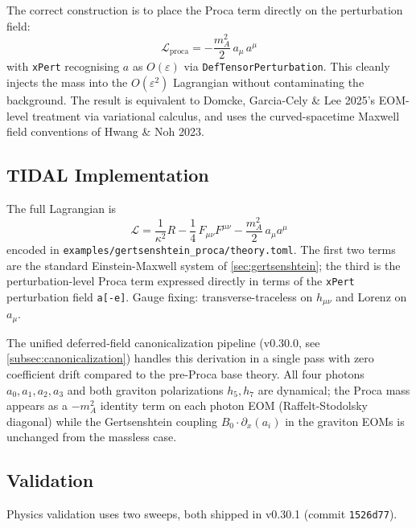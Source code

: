 The correct construction is to place the Proca term directly on the
perturbation field:
\begin{equation}
  \mathcal{L}_{\mathrm{proca}}
  = - \frac{m_A^2}{2}\, a_\mu\, a^\mu
  \label{eq:proca-perturbation}
\end{equation}
with \texttt{xPert} recognising $a$ as $O(\varepsilon)$ via
\texttt{DefTensorPerturbation}. This cleanly injects the mass into the
$O(\varepsilon^2)$ Lagrangian without contaminating the background. The
result is equivalent to Domcke, Garcia-Cely \& Lee 2025's EOM-level
treatment via variational calculus, and uses the curved-spacetime Maxwell
field conventions of Hwang \& Noh 2023.

\subsection{TIDAL Implementation}
\label{subsec:proca-implementation}

The full Lagrangian is
\begin{equation}
  \mathcal{L}
  = \frac{1}{\kappa^2} R
    - \frac{1}{4}\, F_{\mu\nu} F^{\mu\nu}
    - \frac{m_A^2}{2}\, a_\mu a^\mu
  \label{eq:gertsenshtein-proca-lagrangian}
\end{equation}
encoded in \texttt{examples/gertsenshtein\_proca/theory.toml}. The first
two terms are the standard Einstein-Maxwell system of
\cref{sec:gertsenshtein}; the third is the perturbation-level Proca term
expressed directly in terms of the \texttt{xPert} perturbation field
\texttt{a[-e]}. Gauge fixing: transverse-traceless on $h_{\mu\nu}$ and
Lorenz on $a_\mu$.

The unified deferred-field canonicalization pipeline (v0.30.0, see
\cref{subsec:canonicalization}) handles this derivation in a single pass
with zero coefficient drift compared to the pre-Proca base theory. All
four photons $a_0, a_1, a_2, a_3$ and both graviton polarizations $h_5,
h_7$ are dynamical; the Proca mass appears as a $-m_A^2$ identity term
on each photon EOM (Raffelt-Stodolsky diagonal) while the Gertsenshtein
coupling $B_0 \cdot \partial_x(a_i)$ in the graviton EOMs is unchanged
from the massless case.

\subsection{Validation}
\label{subsec:proca-validation}

Physics validation uses two sweeps, both shipped in v0.30.1 (commit
\texttt{1526d77}).

